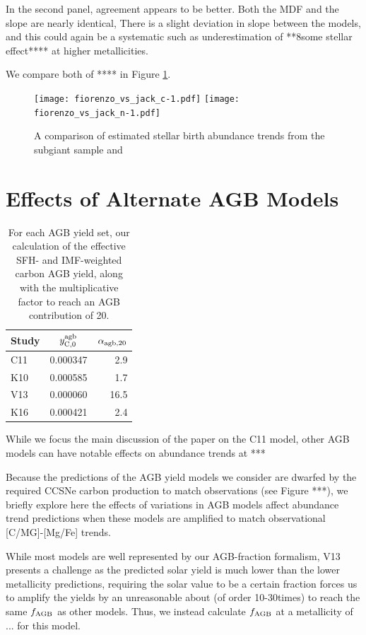 \documentclass[fleqn,usenatbib]{mnras}
\begin{document}
In the second panel, agreement appears to be better. Both the MDF and the slope are nearly identical,
There is a slight deviation in slope between the models, and this could again be a systematic such as underestimation of **8some stellar effect**** at higher metallicities.

We compare both of **** in Figure \ref{fig:fiorenzo_jack}.


\begin{figure}
    \centering
    \texttt{[image: fiorenzo\_vs\_jack\_c-1.pdf]}
    \texttt{[image: fiorenzo\_vs\_jack\_n-1.pdf]}
    \caption{A comparison of estimated stellar birth abundance trends from the subgiant sample and
        \citet{fiorenzo+21}
    }
    \label{fig:fiorenzo_jack}
\end{figure}

\section{Effects of Alternate AGB Models}\label{sec:alt_agb}

\begin{table}
	\centering
	\caption{For each AGB yield set, our calculation of the effective SFH- and IMF-weighted carbon AGB yield, along with the multiplicative factor to reach an AGB contribution of 20.}
	\label{tab:alpha_agb}
	\begin{tabular}{lcr} %
		\hline
		Study & $y_{\rm C, 0}^{\rm agb}$ & $\alpha_{\rm agb, 20}$\\
		\hline
		C11 & 0.000347 & 2.9\\
		K10 & 0.000585 & 1.7\\
		V13 & 0.000060 & 16.5\\
		K16 & 0.000421 & 2.4\\
		\hline
	\end{tabular}
\end{table}


While we focus the main discussion of the paper on the C11 model, other AGB models can have notable effects on abundance trends at ***

Because the predictions of the AGB yield models we consider are dwarfed by the required CCSNe carbon production to match observations (see Figure ***), we briefly explore here the effects of variations in AGB models affect abundance trend predictions when these models are amplified to match observational [C/MG]-[Mg/Fe] trends. 

While most models are well represented by our AGB-fraction formalism, V13 presents a challenge as the predicted solar yield is much lower than the lower metallicity predictions, requiring the solar value to be a certain fraction forces us to amplify the yields by an unreasonable about (of order 10-30times) to reach the same $f_{\rm AGB}$ as other models. Thus, we instead calculate $f_{\rm AGB}$ at a metallicity of ... for this model. 
\end{document}
